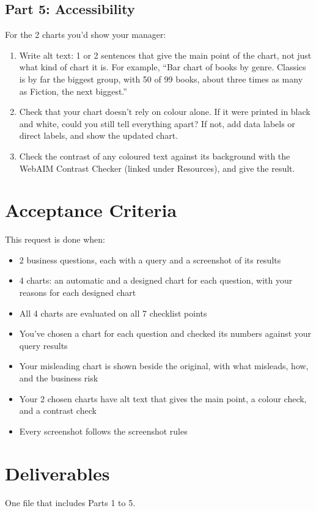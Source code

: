 \documentclass[12pt]{article}
\begin{document}
\subsection*{Part 5: Accessibility}
For the 2 charts you'd show your manager:
\begin{enumerate}
    \item Write alt text: 1 or 2 sentences that give the main point of the chart, not just what kind of chart it is. For example, ``Bar chart of books by genre. Classics is by far the biggest group, with 50 of 99 books, about three times as many as Fiction, the next biggest.''
    \item Check that your chart doesn't rely on colour alone. If it were printed in black and white, could you still tell everything apart? If not, add data labels or direct labels, and show the updated chart.
    \item Check the contrast of any coloured text against its background with the WebAIM Contrast Checker (linked under Resources), and give the result.
\end{enumerate}

\section*{Acceptance Criteria}
This request is done when:
\begin{itemize}
    \item 2 business questions, each with a query and a screenshot of its results
    \item 4 charts: an automatic and a designed chart for each question, with your reasons for each designed chart
    \item All 4 charts are evaluated on all 7 checklist points
    \item You've chosen a chart for each question and checked its numbers against your query results
    \item Your misleading chart is shown beside the original, with what misleads, how, and the business risk
    \item Your 2 chosen charts have alt text that gives the main point, a colour check, and a contrast check
    \item Every screenshot follows the screenshot rules
\end{itemize}

\section*{Deliverables}
One file that includes Parts 1 to 5.
\end{document}
